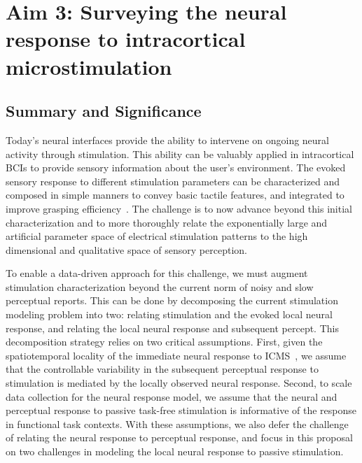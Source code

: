 \documentclass[12pt,oneside]{report}
\begin{document}

\chapter{Aim 3: Surveying the neural response to intracortical microstimulation}


\section{Summary and Significance}

Today’s neural interfaces provide the ability to intervene on ongoing neural activity through stimulation. This ability can be valuably applied in intracortical BCIs to provide sensory information about the user’s environment. The evoked sensory response to different stimulation parameters can be characterized and composed in simple manners to convey basic tactile features, and integrated to improve grasping efficiency~\citep{flesher2021functional,valle2025tactile}. The challenge is to now advance beyond this initial characterization and to more thoroughly relate the exponentially large and artificial parameter space of electrical stimulation patterns to the high dimensional and qualitative space of sensory perception.

To enable a data-driven approach for this challenge, we must augment stimulation characterization beyond the current norm of noisy and slow perceptual reports. This can be done by decomposing the current stimulation modeling problem into two: relating stimulation and the evoked local neural response, and relating the local neural response and subsequent percept. This decomposition strategy relies on two critical assumptions. First, given the spatiotemporal locality of the immediate neural response to ICMS~\citep{eles2021temporal,kumaravelu2022stoney,kumaravelu2024neural}, we assume that the controllable variability in the subsequent perceptual response to stimulation is mediated by the locally observed neural response. Second, to scale data collection for the neural response model, we assume that the neural and perceptual response to passive task-free stimulation is informative of the response in functional task contexts. With these assumptions, we also defer the challenge of relating the neural response to perceptual response, and focus in this proposal on two challenges in modeling the local neural response to passive stimulation.
\end{document}
